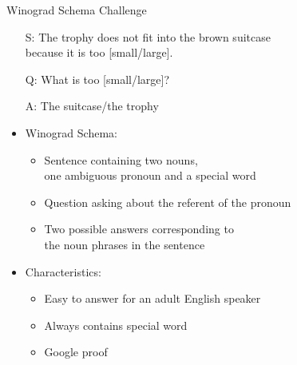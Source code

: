 \documentclass[smaller,dvipsnames,ratio=169]{beamer}
\begin{document}
\begin{frame}{Winograd Schema Challenge} 
	\begin{itemize}
		\small
		\item[S:] The trophy does not fit into the brown suitcase\\ because \alert{it} is too \alert{[small/large]}.
		\item[Q:] What is too [small/large]?
		\item[A:] The suitcase/the trophy
	\end{itemize} 
\begin{itemize}
	\item Winograd Schema: 
	\begin{itemize}
		\normalsize
		\item Sentence containing two nouns, \\one ambiguous \alert{pronoun} and a special word
		\item Question asking about the referent of the pronoun
		\item Two possible answers corresponding to\\ the noun phrases in the sentence
	\end{itemize}
	 \item Characteristics:
	  \begin{itemize}
	  	\normalsize
	  	\item Easy to answer for an adult English speaker
	  	\item Always contains \alert{special word}
	  	\item Google proof
	  \end{itemize}
\end{itemize}
\end{frame}
\end{document}

